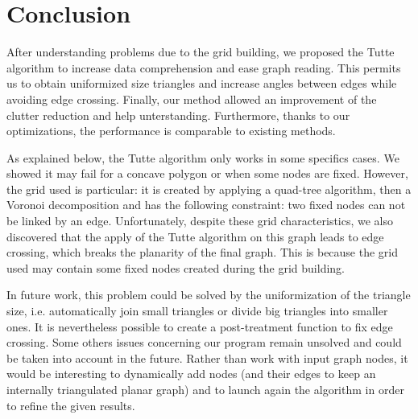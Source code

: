 \chapter*{Conclusion}

After understanding problems due to the grid building, we proposed the Tutte algorithm to increase data comprehension and ease graph reading. This permits us to obtain uniformized size triangles and increase angles between edges while avoiding edge crossing. 
Finally, our method allowed an improvement of the clutter reduction and help unterstanding. Furthermore, thanks to our optimizations, the performance is comparable to existing methods.


As explained below, the Tutte algorithm only works in some specifics cases. We showed it may fail for a concave polygon or when some nodes are fixed. However, the grid used is particular: it is created by applying a quad-tree algorithm, then a Voronoi decomposition and has the following constraint: two fixed nodes can not be linked by an edge.
Unfortunately, despite these grid characteristics, we also discovered that the apply of the Tutte algorithm on this graph leads to edge crossing, which breaks the planarity of the final graph. This is because the grid used may contain some fixed nodes created during the grid building.


In future work, this problem could be solved by the uniformization of the triangle size, i.e. automatically join small triangles or divide big triangles into smaller ones. It is nevertheless possible to create a post-treatment function to fix edge crossing. 
Some others issues concerning our program remain unsolved and could be taken into account in the future. Rather than work with input graph nodes, it would be interesting to dynamically add nodes (and their edges to keep an internally triangulated planar graph) and to launch again the algorithm in order to refine the given results.

